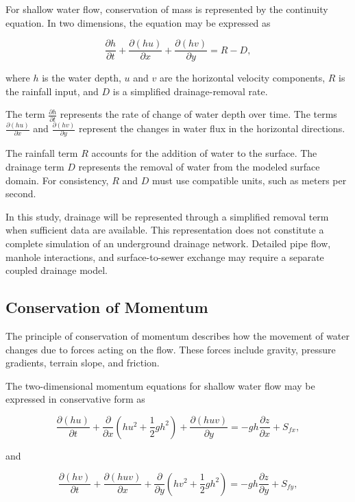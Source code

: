 For shallow water flow, conservation of mass is represented by the continuity equation. In two dimensions, the equation may be expressed as

\[
\frac{\partial h}{\partial t}
+
\frac{\partial (hu)}{\partial x}
+
\frac{\partial (hv)}{\partial y}
=
R-D,
\]

where $h$ is the water depth, $u$ and $v$ are the horizontal velocity components, $R$ is the rainfall input, and $D$ is a simplified drainage-removal rate.

The term $\frac{\partial h}{\partial t}$ represents the rate of change of water depth over time. The terms $\frac{\partial (hu)}{\partial x}$ and $\frac{\partial (hv)}{\partial y}$ represent the changes in water flux in the horizontal directions.

The rainfall term $R$ accounts for the addition of water to the surface. The drainage term $D$ represents the removal of water from the modeled surface domain. For consistency, $R$ and $D$ must use compatible units, such as meters per second.

In this study, drainage will be represented through a simplified removal term when sufficient data are available. This representation does not constitute a complete simulation of an underground drainage network. Detailed pipe flow, manhole interactions, and surface-to-sewer exchange may require a separate coupled drainage model.

\subsection{Conservation of Momentum}


The principle of conservation of momentum describes how the movement of water changes due to forces acting on the flow. These forces include gravity, pressure gradients, terrain slope, and friction.

The two-dimensional momentum equations for shallow water flow may be expressed in conservative form as

\[
\frac{\partial (hu)}{\partial t}
+
\frac{\partial}{\partial x}
\left(hu^2+\frac{1}{2}gh^2\right)
+
\frac{\partial (huv)}{\partial y}
=
-gh\frac{\partial z}{\partial x}
+
S_{fx},
\]

and

\[
\frac{\partial (hv)}{\partial t}
+
\frac{\partial (huv)}{\partial x}
+
\frac{\partial}{\partial y}
\left(hv^2+\frac{1}{2}gh^2\right)
=
-gh\frac{\partial z}{\partial y}
+
S_{fy},
\]

